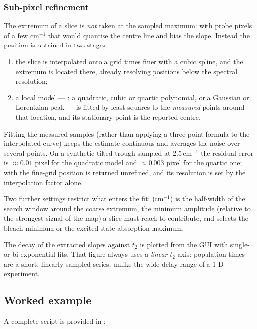 \subsubsection{Sub-pixel refinement}
The extremum of a slice is \emph{not} taken at the sampled maximum: with probe
pixels of a few cm$^{-1}$ that would quantise the centre line and bias the
slope. Instead the position is obtained in two stages:
\begin{enumerate}
  \item the slice is interpolated onto a grid 
        times finer with a cubic spline, and the extremum is located there,
        already resolving positions below the spectral resolution;
  \item a local model --- : a quadratic, cubic or
        quartic polynomial, or a Gaussian or Lorentzian peak --- is fitted by
        least squares to the \emph{measured} points around that location, and
        its stationary point is the reported centre.
\end{enumerate}
Fitting the measured samples (rather than applying a three-point formula to the
interpolated curve) keeps the estimate continuous and averages the noise over
several points. On a synthetic tilted trough sampled at 2.5\,cm$^{-1}$ the
residual error is $\approx0.01$ pixel for the quadratic model and
$\approx0.003$ pixel for the quartic one; with 
the fine-grid position is returned unrefined, and its resolution is set by the
interpolation factor alone.

Two further settings restrict what enters the fit:
 (cm$^{-1}$) is the half-width of the search window around
the coarse extremum,  the minimum amplitude
(relative to the strongest signal of the map) a slice must reach to contribute,
and  selects the bleach minimum or the excited-state
absorption maximum.

The decay of the extracted slopes against $t_2$ is plotted from the GUI with
single- or bi-exponential fits. That figure always uses a \emph{linear} $t_2$
axis: population times are a short, linearly sampled series, unlike the wide
delay range of a 1-D experiment.

\subsection{Worked example}
A complete script is provided in :


